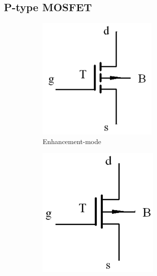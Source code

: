 \subsection{P-type MOSFET}

\begin{figure}[H]
  \centering
  \begin{subfigure}{.3\textwidth}
    \centering
    \includegraphics[width=\linewidth]{figures/EPMOS}
    \caption{Enhancement-mode}
    \label{fig:}
  \end{subfigure}%
  \begin{subfigure}{.3\textwidth}
    \centering
    \includegraphics[width=\linewidth]{figures/DPMOS}

\end{subfigure}
\end{figure}
